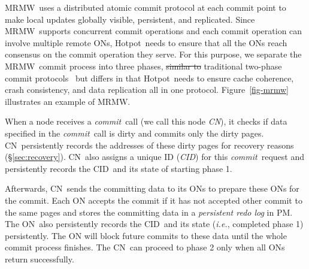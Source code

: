 \documentclass[sigconf]{acmart}
\renewcommand{\em}{\it}
\newcommand{\ie}{\textit{i.e.}}
\newcommand{\commitxact}{\textit{commit}}
\newcommand{\commit}{\textit{commit}}
\newcommand{\nvm}{PM}
\newcommand{\hotpot}{Hotpot}
\newcommand{\mrmw}{MRMW}
\newcommand{\on}{ON}
\newcommand{\xn}{CN}
\newcommand{\xactid}{CID}
\providecommand{\DIFadd}[1]{{\protect\color{blue}\uwave{#1}}} %
\providecommand{\DIFdel}[1]{{\protect\color{red}\sout{#1}}}                      %
\providecommand{\DIFaddbegin}{} %
\providecommand{\DIFaddend}{} %
\providecommand{\DIFdelbegin}{} %
\providecommand{\DIFdelend}{} %
\begin{document}
{\mrmw\ uses a distributed atomic commit protocol at each commit point %
to make local updates globally visible, persistent, and replicated.
Since \mrmw\ supports concurrent commit operations 
and each commit operation can involve multiple remote \on{}s,
\hotpot\ needs to ensure that all the \on{}s reach consensus on the commit operation they serve. 
For this purpose, we separate the \mrmw\ commit process into three phases,
\DIFdelbegin \DIFdel{similar to }\DIFdelend \DIFaddbegin \DIFadd{based on }\DIFaddend traditional two-phase commit protocols~\cite{Samaras93,Gray78,Lampson81} but differs in that
\hotpot\ needs to ensure cache coherence, crash consistency, and data replication all in one protocol.
Figure~\ref{fig-mrmw} illustrates an example of \mrmw. 

\DIFdelbegin %

\DIFdelend {} 
When a node receives a \commitxact\ call (we call this node {\em \xn}), it checks if data specified in the \commitxact\ call is dirty
and commits only the dirty pages.
\xn\ persistently records the addresses of these dirty pages for recovery reasons (\S\ref{sec:recovery}).
\xn\ also assigns a unique ID ({\em \xactid}) for this \commitxact\ request and persistently records the \xactid\ and its state of starting phase 1. 

Afterwards, \xn\ sends the committing data to its \on{}s 
to prepare these \on{}s for the commit.
Each \on{} accepts the commit if it has not accepted other commit to the same pages
and stores the committing data in a {\em persistent redo log} in \nvm.
The \on\ also persistently records the \xactid\ and its state (\ie, completed phase 1) persistently.
The \on{} will block future commits to these data until the whole commit process finishes.
The \xn\ can proceed to phase 2 only when all \on{}s return successfully.

}
\end{document}
